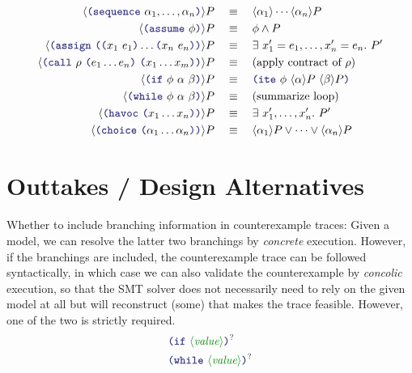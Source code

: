 \documentclass[runningheads]{llncs}
\begin{document}
\begin{align*}
\DIA{\LP \terminal{sequence}~ \alpha_1, \dots, \alpha_n \RP}{P}
    &\quad \equiv \quad
         \DIA{\alpha_1}{} \cdots {\DIA{\alpha_n}{P}}
    \\
\DIA{\LP \terminal{assume}~\phi \RP}{P}
    &\quad \equiv \quad
         \phi \land P
    \\
\DIA{\LP \terminal{assign}~\LP \LP x_1~e_1 \RP \dots \LP x_n~e_n \RP \RP}{P}
    &\quad \equiv \quad
         \exists\ x'_1 = e_1, \dots, x'_n = e_n.\ P'
    \\
\DIA{\LP \terminal{call}~ \rho~ \LP e_1 \dots e_n \RP~
                               \LP x_1 \dots x_m \RP \RP}{P}
    &\quad \equiv \quad
        \text{(apply contract of $\rho$)}
    \\
\DIA{\LP \terminal{if}~\phi~\alpha~\beta \RP}{P}
    &\quad \equiv \quad
        \LP \terminal{ite}~\phi~
                \DIA{\alpha}{P}~
                \DIA{\beta}{P} \RP
    \\
\DIA{\LP \terminal{while}~\phi~\alpha~\beta \RP}{P}
    &\quad \equiv \quad
        \text{(summarize loop)}
    \\
\DIA{\LP \terminal{havoc}~\LP x_1 \dots x_n \RP \RP}{P}
    &\quad \equiv \quad
         \exists\ x'_1, \dots, x'_n.\ P'
    \\
\DIA{\LP \terminal{choice}~\LP \alpha_1 \dots \alpha_n \RP \RP}{P}
    &\quad \equiv \quad
         \DIA{\alpha_1}{P} \lor \dots \lor \DIA{\alpha_n}{P}
\end{align*}

\section{Outtakes / Design Alternatives}

Whether to include branching information in counterexample traces:
Given a model, we can resolve the latter two branchings by \emph{concrete} execution.
However, if the branchings are included, the counterexample trace
can be followed syntactically, in which case we can also validate the counterexample
by \emph{concolic} execution, so that the SMT solver does not necessarily need to rely on the given model at all but will reconstruct (some) that makes the trace feasible.
However, one of the two is strictly required.
\begin{align*}
& \LP \terminal{if}~     \nonterminal{value} \RP\ropt \\
& \LP \terminal{while}~  \nonterminal{value} \RP\ropt \\
\end{align*}
\end{document}
